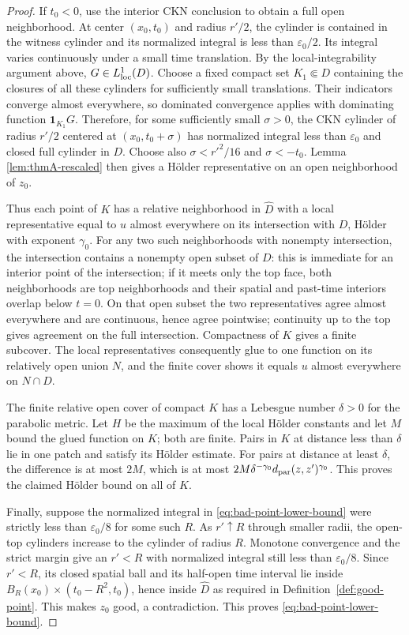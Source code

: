 \documentclass[11pt,letterpaper]{article}
\numberwithin{equation}{section}
\theoremstyle{plain}
\theoremstyle{definition}
\theoremstyle{remark}
\begin{document}
\begin{proof}
If $t_0<0$, use the interior CKN conclusion to obtain a full open
neighborhood.  At center $(x_0,t_0)$ and radius $r'/2$, the cylinder is
contained in the witness cylinder and its normalized integral is less
than $\varepsilon_0/2$.  Its integral varies continuously under a small time translation.
  By the local-integrability argument above, $G\in L^1_{\rm loc}(D)$.
  Choose a fixed compact set $K_1\Subset D$ containing the closures of all
  these cylinders for sufficiently small translations.  Their indicators
  converge almost everywhere, so dominated convergence applies with
  dominating function $\mathbf 1_{K_1}G$.  Therefore, for some sufficiently
  small $\sigma>0$, the CKN cylinder of radius $r'/2$ centered at
$(x_0,t_0+\sigma)$ has normalized integral less than $\varepsilon_0$ and
closed full cylinder in $D$.  Choose also $\sigma<r'^2/16$ and
$\sigma<-t_0$.  Lemma
\ref{lem:thmA-rescaled} then gives a Hölder representative on an open
neighborhood of $z_0$.

Thus each point of $K$ has a relative neighborhood in $\widehat D$ with
a local representative equal to $u$ almost everywhere on its intersection
with $D$, Hölder with exponent $\gamma_0$.  For any two such neighborhoods
with nonempty intersection, the intersection contains a nonempty open
subset of $D$: this is immediate for an interior point of the intersection;
if it meets only the top face, both neighborhoods are top neighborhoods
and their spatial and past-time interiors overlap below $t=0$.  On that
open subset the two representatives agree almost everywhere and are
continuous, hence agree pointwise; continuity up to the top gives agreement
on the full intersection.  Compactness of $K$ gives a finite subcover.
The local representatives consequently glue to one function on its
relatively open union $N$, and the finite cover shows it equals $u$ almost
everywhere on $N\cap D$.

The finite relative open cover of compact $K$ has a Lebesgue number
$\delta>0$ for the parabolic metric.  Let $H$ be the maximum of the local
Hölder constants and let $M$ bound the glued function on $K$; both are
finite.  Pairs in $K$ at distance less than $\delta$ lie in one patch and
satisfy its Hölder estimate.  For pairs at distance at least $\delta$,
the difference is at most $2M$, which is at most
$2M\delta^{-\gamma_0}d_{\rm par}(z,z')^{\gamma_0}$.  This proves the
claimed Hölder bound on all of $K$.

Finally, suppose the normalized integral in \eqref{eq:bad-point-lower-bound}
were strictly less than $\varepsilon_0/8$ for some such $R$.  As
$r'\uparrow R$ through smaller radii, the open-top cylinders increase to
the cylinder of radius $R$.  Monotone convergence and the strict margin
give an $r'<R$ with normalized integral still less than
$\varepsilon_0/8$.  Since $r'<R$, its closed spatial ball and its
half-open time interval lie inside
$B_R(x_0)\times(t_0-R^2,t_0)$, hence inside $\widehat D$ as required in
Definition~\ref{def:good-point}.  This makes $z_0$ good, a contradiction.
This proves \eqref{eq:bad-point-lower-bound}.
\end{proof}
\end{document}
